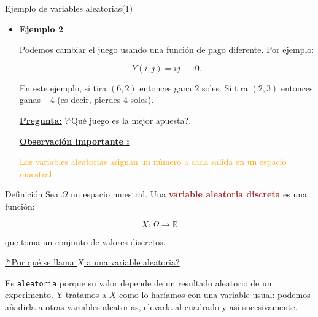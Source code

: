 \documentclass[10pt]{beamer}
\begin{document}
\begin{frame}{Ejemplo de variables aleatorias(1)}
\begin{itemize}
\item \small {\textbf{Ejemplo 2}
	
Podemos cambiar el juego usando una funci\'on de pago diferente. Por ejemplo:

\vspace{0.2cm}

\[
Y(i,j) = ij -10.
\]

\vspace{0.2cm}

En este ejemplo, si tira $(6, 2)$ entonces gana  $2$ soles. Si tira $(2, 3)$ entonces ganas  $-4$ (es decir, pierdes $4$ soles).

\vspace{0.2cm}

\textbf{\small{\underline{Pregunta:}}}
?`Qu\'e juego es la mejor apuesta?.

\vspace{0.5cm}


\textbf{\small{\underline{Observaci\'on importante :}}}

\vspace{0.2cm}

\textcolor{orange}{Las variables aleatorias asignan un n\'umero a cada salida en un espacio muestral.}
}	
\end{itemize}	
\end{frame}

\begin{frame}{Definici\'on }
Sea $\Omega $ un espacio muestral. Una \textbf{\textcolor{brown}{variable aleatoria discreta}} es una funci\'on:

\[
X: \Omega \rightarrow \mathbb{R}
\]

que toma un conjunto de valores discretos.

\vspace{0.2cm}

\small{\underline{?`Por qu\'e se llama $X$ a una variable aleatoria?}


Es \texttt{aleatoria} porque su valor depende de un resultado aleatorio de un experimento. Y tratamos a $X$ como lo har\'iamos con una variable usual: podemos a\~nadirla a otras variables aleatorias, elevarla al cuadrado y as\'i sucesivamente.}
\end{frame}
\end{document}
